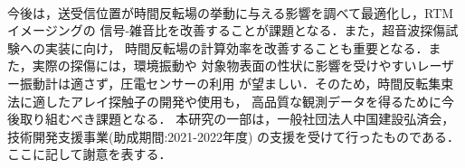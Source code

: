 ﻿\documentclass{jjsce}
\begin{document}
\\
\hspace{\parindent}
今後は，送受信位置が時間反転場の挙動に与える影響を調べて最適化し，RTMイメージングの
信号-雑音比を改善することが課題となる．また，超音波探傷試験への実装に向け，
時間反転場の計算効率を改善することも重要となる．また，実際の探傷には，環境振動や
対象物表面の性状に影響を受けやすいレーザー振動計は適さず，圧電センサーの利用
が望ましい．そのため，時間反転集束法に適したアレイ探触子の開発や使用も，
高品質な観測データを得るために今後取り組むべき課題となる．
\Acknowledgment %
本研究の一部は，一般社団法人中国建設弘済会，技術開発支援事業(助成期間:2021-2022年度)
の支援を受けて行ったものである．ここに記して謝意を表する．
\end{document}
